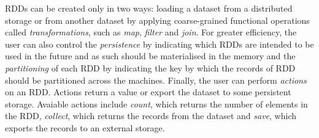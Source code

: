 RDDs can be created only in two ways: loading a dataset from a distributed storage or from another dataset by applying coarse-grained functional operations called \emph{transformations}, such as \emph{map}, \emph{filter} and \emph{join}. For greater efficiency, the user can also control the \emph{persistence} by indicating which RDDs are intended to be used in the future and as such should be materialised in the memory and the \emph{partitioning} of each RDD by indicating the key by which the records of RDD should be partitioned across the machines. Finally, the user can perform \emph{actions} on an RDD. Actions return a value or export the dataset to some persistent storage. Avaiable actions include \emph{count}, which returns the number of elements in the RDD, \emph{collect}, which returns the records from the dataset and \emph{save}, which exports the records to an external storage.

